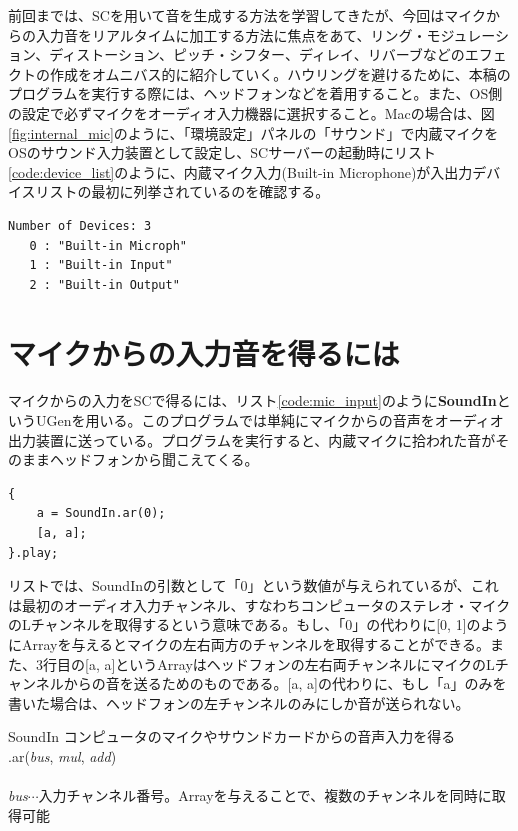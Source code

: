 \documentclass{jsarticle}
\begin{document}
\begin{figure}

\end{figure}
前回までは、SCを用いて音を生成する方法を学習してきたが、今回はマイクからの入力音をリアルタイムに加工する方法に焦点をあて、リング・モジュレーション、ディストーション、ピッチ・シフター、ディレイ、リバーブなどのエフェクトの作成をオムニバス的に紹介していく。ハウリングを避けるために、本稿のプログラムを実行する際には、ヘッドフォンなどを着用すること。また、OS側の設定で必ずマイクをオーディオ入力機器に選択すること。Macの場合は、図\ref{fig:internal_mic}のように、「環境設定」パネルの「サウンド」で内蔵マイクをOSのサウンド入力装置として設定し、SCサーバーの起動時にリスト\ref{code:device_list}のように、内蔵マイク入力(Built-in Microphone)が入出力デバイスリストの最初に列挙されているのを確認する。

\begin{lstlisting}[caption=入出力デバイスのリスト,label=code:device_list]
Number of Devices: 3
   0 : "Built-in Microph"
   1 : "Built-in Input"
   2 : "Built-in Output"
\end{lstlisting}

\section{マイクからの入力音を得るには}
マイクからの入力をSCで得るには、リスト\ref{code:mic_input}のように{\bf SoundIn}というUGenを用いる。このプログラムでは単純にマイクからの音声をオーディオ出力装置に送っている。プログラムを実行すると、内蔵マイクに拾われた音がそのままヘッドフォンから聞こえてくる。

\begin{lstlisting}[caption=マイク入力,label=code:mic_input]
{
	a = SoundIn.ar(0);
	[a, a];
}.play;
\end{lstlisting}

リストでは、SoundInの引数として「0」という数値が与えられているが、これは最初のオーディオ入力チャンネル、すなわちコンピュータのステレオ・マイクのLチャンネルを取得するという意味である。もし、「0」の代わりに[0, 1]のようにArrayを与えるとマイクの左右両方のチャンネルを取得することができる。また、3行目の[a, a]というArrayはヘッドフォンの左右両チャンネルにマイクのLチャンネルからの音を送るためのものである。[a, a]の代わりに、もし「a」のみを書いた場合は、ヘッドフォンの左チャンネルのみにしか音が送られない。
\begin{itembox}[l]{SoundIn}
{\footnotesize 
コンピュータのマイクやサウンドカードからの音声入力を得る\\
.ar({\it bus}, {\it mul}, {\it add})\\\\
{\it bus}$\cdots$入力チャンネル番号。Arrayを与えることで、複数のチャンネルを同時に取得可能\\
}
\end{itembox}
\end{document}
